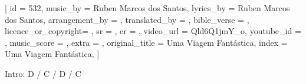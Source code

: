 [
    id                  = {532},
    music_by            = {Ruben Marcos dos Santos}, %
    lyrics_by           = {Ruben Marcos dos Santos}, %
    arrangement_by      = {}, %
    translated_by       = {}, %
    bible_verse         = {},
    licence_or_copyright= {},
    sr                  = {},
    cr                  = {},
    video_url           = {Qld6Q1jmY_o}, %
    youtube_id          = {}, %
    music_score         = {}, %
    extra               = {},
    original_title      = {Uma Viagem Fantástica}, %
    index               = {Uma Viagem Fantástica},
]

\beginverse
Intro:
D / C / D / C
\endverse

\beginverse

